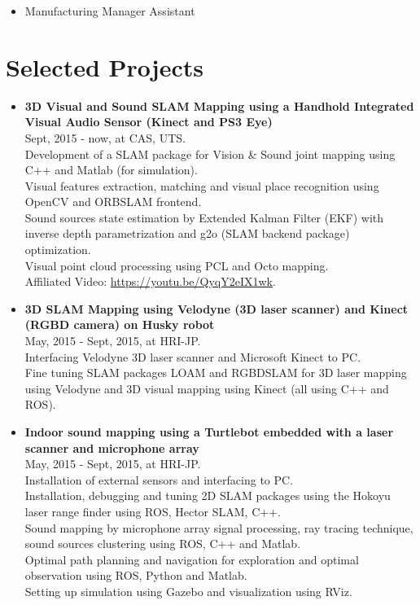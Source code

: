 \documentclass[margin,line]{res}
\begin{document}
\begin{resume}
\begin{itemize}
\vspace*{-2.5mm}
\item[] Manufacturing Manager Assistant
\end{itemize}

\section{\sc Selected Projects} 

\begin{itemize}

\item {\bf 3D Visual and Sound SLAM Mapping using a Handhold Integrated Visual Audio Sensor (Kinect and PS3 Eye)}\\
Sept, 2015 - now, at CAS, UTS.\\
Development of a SLAM package for Vision \& Sound joint mapping using C++ and Matlab (for simulation).\\
Visual features extraction, matching and visual place recognition using OpenCV and ORBSLAM frontend.\\
Sound sources state estimation by Extended Kalman Filter (EKF) with inverse depth parametrization and g2o (SLAM backend package) optimization.\\
Visual point cloud processing using PCL and Octo mapping.\\
Affiliated Video: \href{https://youtu.be/QyqY2eIX1wk}{https://youtu.be/QyqY2eIX1wk}.\\

\item {\bf 3D SLAM Mapping using Velodyne (3D laser scanner) and Kinect (RGBD camera) on Husky robot}\\
May, 2015 - Sept, 2015, at HRI-JP.\\
Interfacing Velodyne 3D laser scanner and Microsoft Kinect to PC.\\
Fine tuning SLAM packages LOAM and RGBDSLAM for 3D laser mapping using Velodyne and 3D visual mapping using Kinect (all using C++ and ROS).\\

\item {\bf Indoor sound mapping using a Turtlebot embedded with a laser scanner and microphone array}\\
May, 2015 - Sept, 2015, at HRI-JP.\\
Installation of external sensors and interfacing to PC.\\
Installation, debugging and tuning 2D SLAM packages using the Hokoyu laser range finder using ROS, Hector SLAM, C++.\\
Sound mapping by microphone array signal processing, ray tracing technique, sound sources clustering using ROS, C++ and Matlab.\\
Optimal path planning and navigation for exploration and optimal observation using ROS, Python and Matlab.\\
Setting up simulation using Gazebo and visualization using RViz.\\



\end{itemize}
\end{resume}
\end{document}
